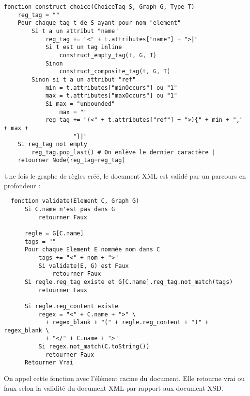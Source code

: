 \documentclass[10pt, a4paper]{article}
\begin{document}
\begin{verbatim}
fonction construct_choice(ChoiceTag S, Graph G, Type T)
    reg_tag = ""
    Pour chaque tag t de S ayant pour nom "element"
        Si t a un attribut "name"
            reg_tag += "<" + t.attributes["name"] + ">|"
            Si t est un tag inline
                construct_empty_tag(t, G, T)
            Sinon
                construct_composite_tag(t, G, T)
        Sinon si t a un attribut "ref"
            min = t.attributes["minOccurs"] ou "1"
            max = t.attributes["maxOccurs"] ou "1"
            Si max = "unbounded"
                max = ""
            reg_tag += "(<" + t.attributes["ref"] + ">){" + min + "," + max +
                    "}|"
    Si reg_tag not empty
        reg_tag.pop_last() # On enlève le dernier caractère |
    retourner Node(reg_tag=reg_tag)
\end{verbatim}

Une fois le graphe de règles créé, le document XML est validé par un
parcours en profondeur :

\begin{verbatim}
  fonction validate(Element C, Graph G)
      Si C.name n'est pas dans G
          retourner Faux

      regle = G[C.name]
      tags = ""
      Pour chaque Element E nommée nom dans C
          tags += "<" + nom + ">"
          Si validate(E, G) est Faux
              retourner Faux
      Si regle.reg_tag existe et G[C.name].reg_tag.not_match(tags)
          retourner Faux

      Si regle.reg_content existe
          regex = "<" + C.name + ">" \
            + regex_blank + "(" + regle.reg_content + ")" + regex_blank \
            + "</" + C.name + ">"
          Si regex.not_match(C.toString())
            retourner Faux
      Retourner Vrai
\end{verbatim}

On appel cette fonction avec l'élément racine du document. Elle retourne
vrai ou faux selon la validité du document XML par rapport aux document
XSD.
\end{document}
